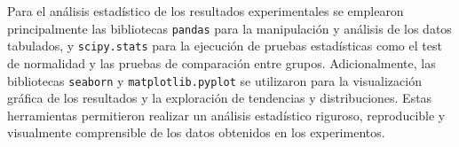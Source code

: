 Para el análisis estadístico de los resultados experimentales se emplearon principalmente las bibliotecas \texttt{pandas} para la manipulación y análisis de los datos tabulados, y \texttt{scipy.stats} para la ejecución de pruebas estadísticas como el test de normalidad y las pruebas de comparación entre grupos. Adicionalmente, las bibliotecas \texttt{seaborn} y \texttt{matplotlib.pyplot} se utilizaron para la visualización gráfica de los resultados y la exploración de tendencias y distribuciones. Estas herramientas permitieron realizar un análisis estadístico riguroso, reproducible y visualmente comprensible de los datos obtenidos en los experimentos.
